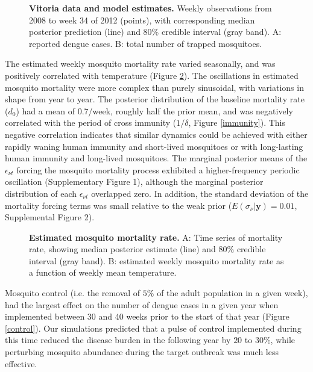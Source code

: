 \documentclass[10pt,letterpaper]{article}
\begin{document}
\begin{figure}[!h]
\caption{{\bf Vitoria data and model estimates.}
Weekly observations from 2008 to week 34 of 2012 (points), with corresponding median posterior prediction (line) and 80\% credible interval (gray band). A: reported dengue cases. B: total number of trapped mosquitoes.
}
\label{timeseries}
\end{figure}

The estimated weekly mosquito mortality rate varied seasonally, and was positively correlated with temperature (Figure \ref{mortality}).
The oscillations in estimated mosquito mortality were more complex than purely sinusoidal, with variations in shape from year to year.
The posterior distribution of the baseline mortality rate ($d_0$) had a mean of 0.7/week, roughly half the prior mean, and was negatively correlated with the period of cross immunity ($1/\delta$, Figure \ref{immunity}).
This negative correlation indicates that similar dynamics could be achieved with either rapidly waning human immunity and short-lived mosquitoes or with long-lasting human immunity and long-lived mosquitoes.
The marginal posterior means of the $\epsilon_{\nu t}$ forcing the mosquito mortality process exhibited a higher-frequency periodic oscillation (Supplementary Figure 1), although the marginal posterior distribution of each $\epsilon_{\nu t}$ overlapped zero.
In addition, the standard deviation of the mortality forcing terms was small relative to the weak prior ($E(\sigma_{\nu}|\mathbf{y}) = 0.01$, Supplemental Figure 2).

\begin{figure}[!h]
\caption{{\bf Estimated mosquito mortality rate.}
A: Time series of mortality rate, showing median posterior estimate (line) and 80\% credible interval (gray band). B: estimated weekly mosquito mortality rate as a function of weekly mean temperature.
}
\label{mortality}
\end{figure}

Mosquito control (i.e. the removal of $5\%$ of the adult population in a given week), had the largest effect on the number of dengue cases in a given year when implemented between 30 and 40 weeks prior to the start of that year (Figure \ref{control}).
Our simulations predicted that a pulse of control implemented during this time reduced the disease burden in the following year by $20$ to $30\%$, while perturbing mosquito abundance during the target outbreak was much less effective.
\end{document}
